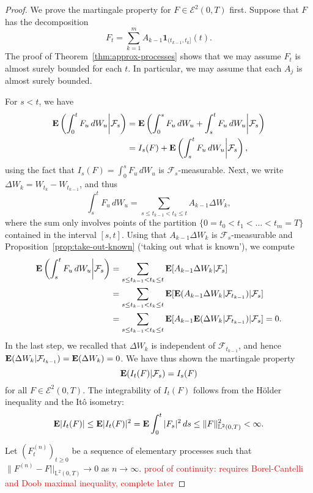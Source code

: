 \begin{proof}
    We prove the martingale property for $F\in\mathcal{E}^2(0,T)$ first. Suppose that $F$ has the decomposition
    \begin{equation*}
        F_t = \sum_{k=1}^m A_{k-1}\mathbf{1}_{(t_{k-1},t_k]}(t).
    \end{equation*}
    The proof of Theorem~\ref{thm:approx-processes} shows that we may assume $F_t$ is almost surely bounded for each $t$. In particular, we may assume that each $A_{j}$ is almost surely bounded.
    
    For $s<t$, we have
    \begin{align*}
        \mathbf{E}\left(\int_0^t F_u\,dW_u \bigg\vert\mathcal{F}_s\right) &= \mathbf{E}\left(\int_0^s F_u\,dW_u + \int_s^t F_u\,dW_u \bigg\vert\mathcal{F}_s\right) \\
        &= I_s(F) + \mathbf{E}\left(\int_s^t F_u\,dW_u \bigg\vert\mathcal{F}_s\right),
    \end{align*}
    using the fact that $I_s(F) = \int_0^s F_u\,dW_u$ is $\mathcal{F}_s$-measurable. Next, we write $\Delta W_k = W_{t_k}-W_{t_{k-1}}$, and thus
    \begin{equation*}
        \int_s^t F_u\,dW_u = \sum_{s\le t_{k-1}<t_k\le t} A_{k-1}\Delta W_k,
    \end{equation*}
    where the sum only involves points of the partition $\{0=t_0<t_1<\ldots <t_m=T\}$ contained in the interval $[s,t]$. Using that $A_{k-1}\Delta W_k$ is $\mathcal{F}_s$-measurable and Proposition~\ref{prop:take-out-known} (`taking out what is known'), we compute
    \begin{align*}
        \mathbf{E}\left(\int_s^t F_u\,dW_u \bigg\vert\mathcal{F}_s\right) &= \sum_{s\le t_{k-1}<t_k\le t} \mathbf{E}[A_{k-1}\Delta W_k|\mathcal{F}_s] \\
        &= \sum_{s\le t_{k-1}<t_k\le t} \mathbf{E}[\mathbf{E}(A_{k-1}\Delta W_k|\mathcal{F}_{t_{k-1}})|\mathcal{F}_s] \\
        &= \sum_{s\le t_{k-1}<t_k\le t} \mathbf{E}[A_{k-1}\mathbf{E}(\Delta W_k|\mathcal{F}_{t_{k-1}})|\mathcal{F}_s] = 0.
    \end{align*}
    In the last step, we recalled that $\Delta W_k$ is independent of $\mathcal{F}_{t_{k-1}}$, and hence $\mathbf{E}(\Delta W_k|\mathcal{F}_{t_{k-1}})=\mathbf{E}(\Delta W_k)=0$. We have thus shown the martingale property
    \begin{equation*}
        \mathbf{E}(I_t(F)|\mathcal{F}_s) = I_s(F)
    \end{equation*}
    for all $F\in\mathcal{E}^2(0,T)$. The integrability of $I_t(F)$ follows from the H\"{o}lder inequality and the It\^{o} isometry:
    \begin{equation*}
        \mathbf{E}|I_t(F)| \le \mathbf{E}|I_t(F)|^2 = \mathbf{E}\int_0^t |F_s|^2\,ds \le \|F\|^2_{\mathbb{L}^2(0,T)}<\infty.
    \end{equation*}
    
    Let $(F^{(n)}_t)_{t\ge 0}$ be a sequence of elementary processes such that $\|F^{(n)}-F||_{\mathbb{L}^2(0,T)}\to 0$ as $n\to\infty$.
    \textcolor{red}{proof of continuity: requires Borel-Cantelli and Doob maximal inequality, complete later}
\end{proof}


